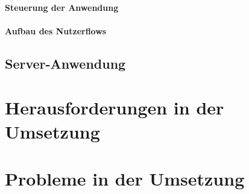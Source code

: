 \paragraph{Steuerung der Anwendung}

\paragraph{Aufbau des Nutzerflows}


\subsection{Server-Anwendung}

\section{Herausforderungen in der Umsetzung}\label{sec:difficulties}











\section{Probleme in der Umsetzung}


